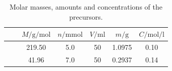 \documentclass[webedition,openright,titles,swedish,english]{LuaUUThesis}\usepackage[]{graphicx}\usepackage[]{xcolor}
\begin{document}
%

\begin{table}[tbp]
\centering
\caption{Molar masses, amounts and concentrations of the precursors.}
\label{tab:0204-precursors-QD}
\small
\begin{tabular}{l@{\;}lS[table-format=3.2]S[table-format=1.1]S[table-format=2.0]S[table-format=1.4]S[table-format=1.2]}\toprule
& & {$M/\unit{\g\per\mol}$} & {$n/\unit{\milli\mol}$} & {$V/\unit{\milli\litre}$} & {$m/\unit{\g}$} & {$C/\unit{\mol\per\litre}$} \\%
\midrule
{} &  & 219.50 & 5.0 & 50 & 1.0975 & 0.10 \\
 &  & 41.96  & 7.0 & 50 & 0.2937 & 0.14 \\
\bottomrule
\end{tabular}
\end{table}

%
\end{document}
